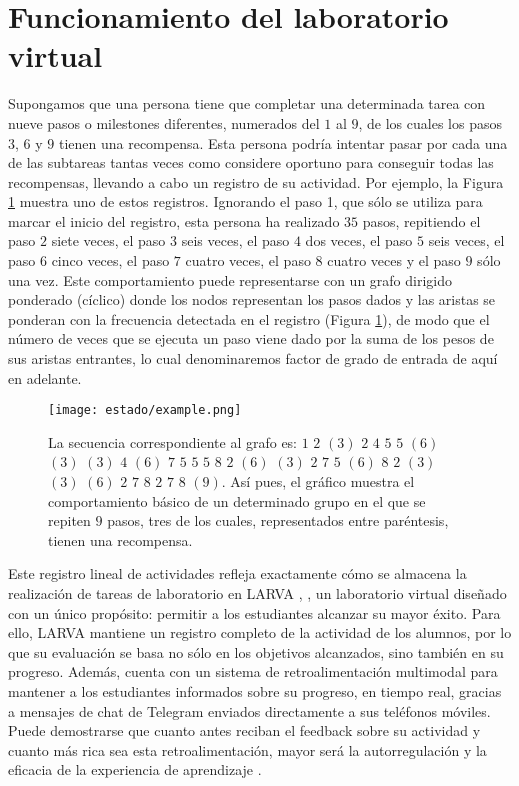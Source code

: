\section{Funcionamiento del laboratorio virtual}\label{sec:funcionamiento}

Supongamos que una persona tiene que completar una determinada tarea con nueve pasos o milestones diferentes, numerados del $1$ al $9$, de los cuales los pasos $3$, $6$ y $9$ tienen una recompensa. Esta persona podría intentar pasar por cada una de las subtareas tantas veces como considere oportuno para conseguir todas las recompensas, llevando a cabo un registro de su actividad. Por ejemplo, la Figura \ref{fig:example} muestra uno de estos registros. Ignorando el paso 1, que sólo se utiliza para marcar el inicio del registro, esta persona ha realizado $35$ pasos, repitiendo el paso $2$ siete veces, el paso $3$ seis veces, el paso $4$ dos veces, el paso $5$ seis veces, el paso $6$ cinco veces, el paso $7$ cuatro veces, el paso $8$ cuatro veces y el paso $9$ sólo una vez. Este comportamiento puede representarse con un grafo dirigido ponderado (cíclico) donde los
nodos representan los pasos dados y las aristas se ponderan con la frecuencia detectada en el registro (Figura \ref{fig:example}), de modo que el número de veces que se ejecuta un paso viene dado por la suma de los pesos de sus aristas entrantes, lo cual denominaremos factor de grado de entrada de aquí en adelante.

\begin{figure}[H]
    \centering
    \texttt{[image: estado/example.png]}
    \caption{La secuencia correspondiente al grafo es: $1$ $2$ $(3)$ $2$ $4$ $5$ $5$ $(6)$ $(3)$ $(3)$ $4$ $(6)$ $7$ $5$ $5$ $5$ $8$ $2$ $(6)$ $(3)$ $2$ $7$ $5$ $(6)$ $8$ $2$ $(3)$ $(3)$ $(6)$ $2$ $7$ $8$ $2$ $7$ $8$ $(9)$. Así pues, el gráfico muestra el comportamiento básico de un determinado grupo en el que se repiten $9$ pasos, tres de los cuales, representados entre paréntesis, tienen una recompensa.}
    \label{fig:example}
\end{figure}

Este registro lineal de actividades refleja exactamente cómo se almacena la realización de tareas de laboratorio en LARVA \cite{Vidal_2022}, \cite{Vidal_2023}, un laboratorio virtual \cite{Vidal_2016} diseñado con un único propósito: permitir a los estudiantes alcanzar su mayor éxito. Para ello, LARVA mantiene un registro completo de la actividad de los alumnos, por lo que su evaluación se basa no sólo en los objetivos alcanzados, sino también en su progreso. Además, cuenta con un sistema de retroalimentación multimodal \cite{Vidal_2022} para mantener a los estudiantes informados sobre su progreso, en tiempo real, gracias a mensajes de chat de Telegram enviados directamente a sus teléfonos móviles. Puede demostrarse que cuanto antes reciban el feedback sobre su actividad y cuanto más rica sea esta retroalimentación, mayor será la autorregulación y la eficacia de la experiencia de aprendizaje \cite{Keller_1968}.

